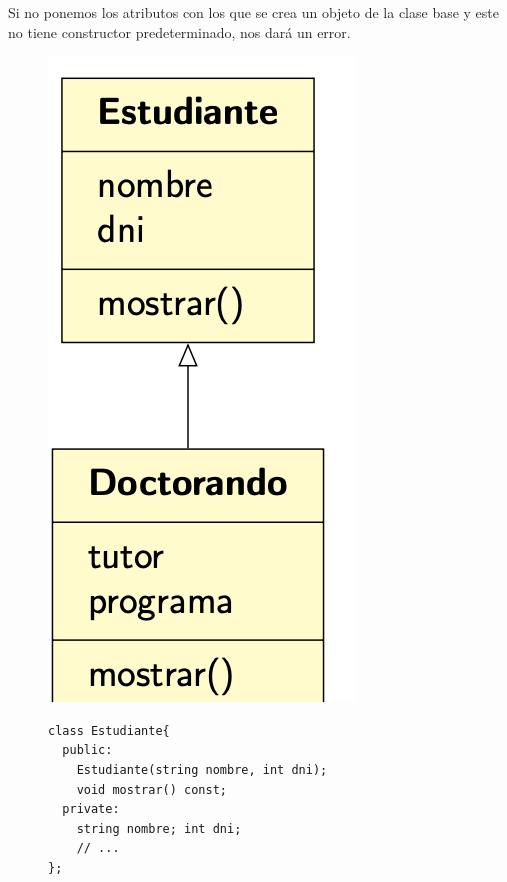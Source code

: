 Si no ponemos los atributos con los que se crea un objeto de la clase base y este no tiene constructor predeterminado, nos dará un error.
\newpage
\begin{figure}
	\begin{minipage}[t]{0.25\textwidth}
	\includegraphics[width=\textwidth]{Imagenes/gen5.png}
	\end{minipage}
\hfill
\begin{minipage}[t]{0.7\textwidth}
\vspace*{-8cm}
	\begin{lstlisting}[frame=single]
class Estudiante{
  public:
    Estudiante(string nombre, int dni);
    void mostrar() const;
  private:
    string nombre; int dni;
    // ...
};


\end{lstlisting}
\end{minipage}
\end{figure}

